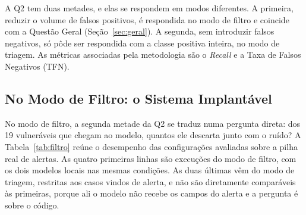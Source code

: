 A Q2 tem duas metades, e elas se respondem em modos diferentes. A primeira, reduzir o volume de falsos positivos, é respondida no modo de filtro e coincide com a Questão Geral (Seção~\ref{sec:geral}). A segunda, sem introduzir falsos negativos, só pôde ser respondida com a classe positiva inteira, no modo de triagem. As métricas associadas pela metodologia são o \textit{Recall} e a Taxa de Falsos Negativos (TFN).

\subsection{No Modo de Filtro: o Sistema Implantável}
\label{subsec:q2filtro}

No modo de filtro, a segunda metade da Q2 se traduz numa pergunta direta: dos 19 vulneráveis que chegam ao modelo, quantos ele descarta junto com o ruído? A Tabela~\ref{tab:filtro} reúne o desempenho das configurações avaliadas sobre a pilha real de alertas. As quatro primeiras linhas são execuções do modo de filtro, com os dois modelos locais nas mesmas condições. As duas últimas vêm do modo de triagem, restritas aos casos vindos de alerta, e não são diretamente comparáveis às primeiras, porque ali o modelo não recebe os campos do alerta e a pergunta é sobre o código.

